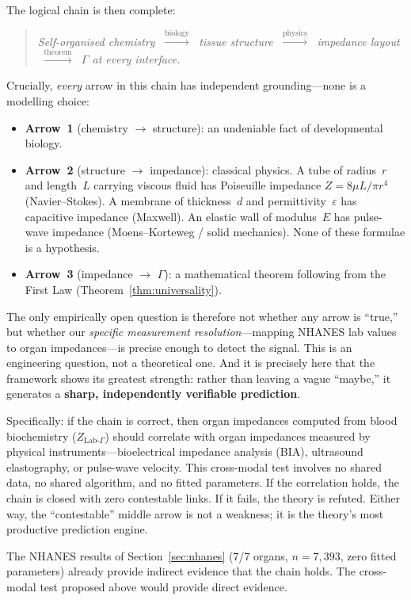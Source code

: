 \documentclass[aps,pre,twocolumn,superscriptaddress,floatfix]{revtex4-2}
\begin{document}
\medskip
The logical chain is then complete:
\begin{quote}
\emph{Self-organised chemistry}
$\;\xrightarrow{\text{biology}}\;$
\emph{tissue structure}
$\;\xrightarrow{\text{physics}}\;$
\emph{impedance layout}
$\;\xrightarrow{\text{theorem}}\;$
\emph{$\Gamma$ at every interface.}
\end{quote}
Crucially, \emph{every} arrow in this chain has independent
grounding---none is a modelling choice:
\begin{itemize}
  \item \textbf{Arrow~1} (chemistry $\to$ structure):
    an undeniable fact of developmental biology.
  \item \textbf{Arrow~2} (structure $\to$ impedance):
    classical physics.  A tube of radius~$r$ and length~$L$
    carrying viscous fluid has Poiseuille impedance
    $Z=8\mu L/\pi r^4$ (Navier--Stokes).
    A membrane of thickness~$d$ and permittivity~$\varepsilon$
    has capacitive impedance (Maxwell).
    An elastic wall of modulus~$E$ has pulse-wave impedance
    (Moens--Korteweg / solid mechanics).
    None of these formulae is a hypothesis.
  \item \textbf{Arrow~3} (impedance $\to$ $\Gamma$):
    a mathematical theorem following from the First Law
    (Theorem~\ref{thm:universality}).
\end{itemize}
The only empirically open question is therefore not whether
any arrow is ``true,'' but whether our \emph{specific
measurement resolution}---mapping NHANES lab values to
organ impedances---is precise enough to detect the signal.
This is an engineering question, not a theoretical one.
And it is precisely here that the framework shows its
greatest strength: rather than leaving a vague ``maybe,''
it generates a \textbf{sharp, independently verifiable
prediction}.

Specifically: if the chain is correct, then organ impedances
computed from blood biochemistry ($Z_{\text{Lab-}\Gamma}$)
should correlate with organ impedances measured by physical
instruments---bioelectrical impedance analysis (BIA),
ultrasound elastography, or pulse-wave velocity.
This cross-modal test involves no shared data, no shared
algorithm, and no fitted parameters.
If the correlation holds, the chain is closed with zero
contestable links.
If it fails, the theory is refuted.
Either way, the ``contestable'' middle arrow is not a
weakness; it is the theory's most productive prediction
engine.

The NHANES results of Section~\ref{sec:nhanes}
(7/7 organs, $n=7{,}393$, zero fitted parameters)
already provide indirect evidence that the chain holds.
The cross-modal test proposed above would provide
direct evidence.
\end{document}
